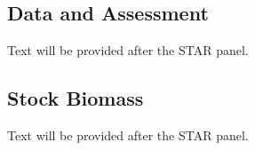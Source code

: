 \documentclass[11pt,
  english,
  a4paper,
]{article}
\begin{document}

\hypertarget{data-and-assessment}{%
\subsection*{Data and Assessment}\label{data-and-assessment}}

\leavevmode\tagmcend\tagstructend

Text will be provided after the STAR panel.


\hypertarget{stock-biomass}{%
\subsection*{Stock Biomass}\label{stock-biomass}}

\leavevmode\tagmcend\tagstructend

Text will be provided after the STAR panel.
\end{document}
